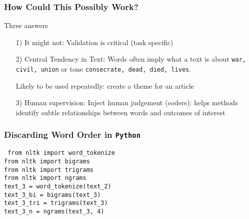 \documentclass{beamer}
\numberwithin{equation}{section}
\begin{document}
\begin{frame}
\frametitle{How Could This Possibly Work?}

Three answers
\begin{itemize}
\item[1)] \alert{It might not}: Validation is critical (task specific)
\item[2)] \alert{Central Tendency in Text}: Words often imply what a text is about
{\tt war, civil, union} or tone {\tt consecrate, dead, died, lives}.
\item[] Likely to be used repeatedly: create a theme for an article
\item[3)] \alert{Human supervision}: Inject human judgement (coders): helps methods identify subtle relationships between words and outcomes of interest
\end{itemize}

\end{frame}


\begin{frame}
\frametitle{Discarding Word Order in {\tt Python}}

{\tt
from nltk import word\_tokenize \\
from nltk import bigrams \\
from nltk import trigrams \\
from nltk import ngrams \\

\vspace{0.25in}
text\_3 = word\_tokenize(text\_2) \\
text\_3\_bi = bigrams(text\_3) \\
text\_3\_tri = trigrams(text\_3)\\
text\_3\_n = ngrams(text\_3, 4)\\

}


\end{frame}
\end{document}
